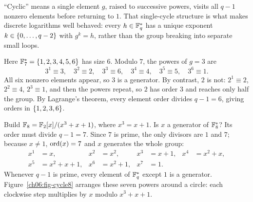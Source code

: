 \begin{intuitionbox}
``Cyclic'' means a single element $g$, raised to successive powers, visits all
$q-1$ nonzero elements before returning to $1$. That single-cycle structure is
what makes discrete logarithms well behaved: every $h \in \mathbb{F}_q^{*}$ has a
unique exponent $k \in \{0,\dots,q-2\}$ with $g^k = h$, rather than the group
breaking into separate small loops.
\end{intuitionbox}

\begin{example}[A generator of $\F_7^{*}$]
\label{ch06:ex-gen7}
Here $\mathbb{F}_7^{*} = \{1,2,3,4,5,6\}$ has size $6$. Modulo $7$, the powers of
$g=3$ are
\[
3^1 \equiv 3,\quad 3^2 \equiv 2,\quad 3^3 \equiv 6,\quad
3^4 \equiv 4,\quad 3^5 \equiv 5,\quad 3^6 \equiv 1.
\]
All six nonzero elements appear, so $3$ is a generator. By contrast, $2$ is
not: $2^1 \equiv 2$, $2^2 \equiv 4$, $2^3 \equiv 1$, and then the powers
repeat, so $2$ has order $3$ and reaches only half the group. By Lagrange's
theorem, every element order divides $q-1=6$, giving orders in $\{1,2,3,6\}$.
\end{example}

\begin{example}[A generator of $\F_8^{*}$]
\label{ch06:ex-gen8}
Build $\mathbb{F}_8 = \mathbb{F}_2[x]/(x^3+x+1)$, where $x^3 = x+1$. Is $x$ a generator of
$\F_8^{*}$? Its order must divide $q-1 = 7$. Since $7$ is prime, the only
divisors are $1$ and $7$; because $x \neq 1$, $\operatorname{ord}(x) = 7$ and $x$ generates
the whole group:
\begin{align*}
x^1 &= x, & x^2 &= x^2, & x^3 &= x+1, & x^4 &= x^2+x, \\
x^5 &= x^2+x+1, & x^6 &= x^2+1, & x^7 &= 1.
\end{align*}
Whenever $q-1$ is prime, every element of $\mathbb{F}_q^{*}$ except $1$ is a generator.
Figure~\ref{ch06:fig-cycle8} arranges these seven powers around a circle: each
clockwise step multiplies by $x$ modulo $x^3+x+1$.
\end{example}


